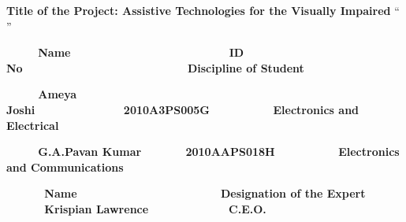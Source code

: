 \bigskip


\bigskip

{
\textbf{Title of the Project: Assistive Technologies for the Visually Impaired
}{\textquotedblleft}\textbf{\textcolor{black}{
}}\textcolor{black}{{\textquotedblright}}}


\bigskip


\bigskip


\bigskip

{\bfseries
\ \ \ \ \ Name\ \ \ \ \ \ \ \ \  \ \ \ \ \ \ \ \ \ \ \ \ \ \ \ \ ID No\ \ \ \ \ \ \ \ \ \ \  \ \ \ \ \ \ \ \ \ \ \  
\ \ \ \ Discipline of Student}

{\bfseries
\ \ \ \ \ Ameya Joshi\ \ \ \ \ \   \ \ \ \ \ \ \ \ 2010A3PS005G\ \ \ \ \ \ 
\ \ \ \ Electronics and Electrical}

{\bfseries
\ \ \ \ \ G.A.Pavan Kumar\ \ \ \ \ \ \ 2010AAPS018H\ \ \ \ \ \ 
\ \ \ \ Electronics and Communications}

\bigskip

{\bfseries
\ \ \ \ \ \ Name \ \ \ \ \ \ \ \ \ \ \ \ \ \ \ \ \ \ \ \ \ \ Designation of the Expert}\newline
{\bfseries
\ \ \ \ \ \ Krispian Lawrence \ \ \ \ \ \ \ \ \ \ \ \ C.E.O.}


\bigskip


\bigskip


\bigskip

